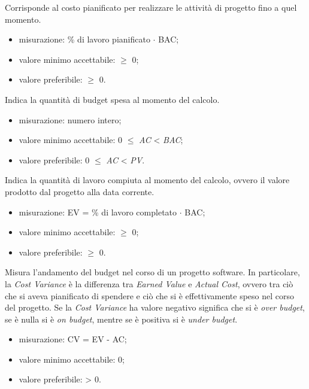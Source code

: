 		Corrisponde al costo pianificato per realizzare le attività di progetto fino a quel momento.
		\begin{itemize}
			\item{misurazione: \% di lavoro pianificato $\cdot$ BAC;}
			\item{valore minimo accettabile: $\geq$ 0;}
			\item{valore preferibile: $\geq$ 0.}
		\end{itemize}
		
		Indica la quantità di budget spesa al momento del calcolo.
		\begin{itemize}
			\item{misurazione: numero intero;}
			\item{valore minimo accettabile: 0 $\leq$ \textit{AC} < \textit{BAC};}
			\item{valore preferibile: 0 $\leq$ \textit{AC} < \textit{PV}.}
		\end{itemize}
		
		Indica la quantità di lavoro compiuta al momento del calcolo, ovvero il valore prodotto dal progetto alla data corrente.
		\begin{itemize}
			\item{misurazione: EV =  \% di lavoro completato $\cdot$ BAC;}
			\item{valore minimo accettabile: $\geq$ 0;}
			\item{valore preferibile: $\geq$ 0.}
		\end{itemize}

		Misura l'andamento del budget nel corso di un progetto software. In particolare, la \textit{Cost Variance} è la differenza tra \textit{Earned Value} e \textit{Actual Cost}, ovvero tra ciò che si aveva pianificato di spendere e ciò che si è effettivamente speso nel corso del progetto.
		Se la \textit{Cost Variance} ha valore negativo significa che si è \textit{over budget}, se è nulla si è \textit{on budget}, mentre se è positiva si è \textit{under budget}.
		\begin{itemize}
			\item{misurazione: CV = EV - AC;}
			\item{valore minimo accettabile: 0;}
			\item{valore preferibile: > 0.}
		\end{itemize}
		
